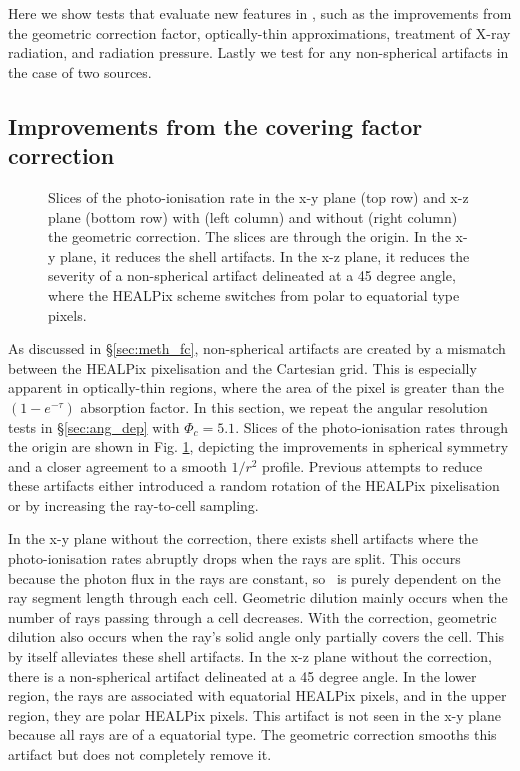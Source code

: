 \documentclass[useAMS,usenatbib]{mn2e}
\begin{document}
Here we show tests that evaluate new features in \moray, such as the
improvements from the geometric correction factor, optically-thin
approximations, treatment of X-ray radiation, and radiation pressure.
Lastly we test for any non-spherical artifacts in the case of two
sources.

\subsection{Improvements from the covering factor correction}
\label{sec:test_fc}

\begin{figure}
  \caption{\label{fig:fc_slices} Slices of the photo-ionisation rate
    in the x-y plane (top row) and x-z plane (bottom row) with (left
    column) and without (right column) the geometric correction.  The
    slices are through the origin.  In the x-y plane, it reduces the
    shell artifacts.  In the x-z plane, it reduces the severity of a
    non-spherical artifact delineated at a 45 degree angle, where the
    HEALPix scheme switches from polar to equatorial type pixels.}
\end{figure}

As discussed in \S\ref{sec:meth_fc}, non-spherical artifacts are
created by a mismatch between the HEALPix pixelisation and the
Cartesian grid.  This is especially apparent in optically-thin
regions, where the area of the pixel is greater than the
$(1-e^{-\tau})$ absorption factor.  In this section, we repeat the
angular resolution tests in \S\ref{sec:ang_dep} with $\Phi_c = 5.1$.
Slices of the photo-ionisation rates through the origin are shown in
Fig. \ref{fig:fc_slices}, depicting the improvements in spherical
symmetry and a closer agreement to a smooth $1/r^2$ profile.  Previous
attempts to reduce these artifacts either introduced a random rotation
of the HEALPix pixelisation \citep[e.g.][]{Abel02_RT, Trac07,
  Krumholz07_ART} or by increasing the ray-to-cell sampling.

In the x-y plane without the correction, there exists shell artifacts
where the photo-ionisation rates abruptly drops when the rays are
split.  This occurs because the photon flux in the rays are constant,
so \kph~is purely dependent on the ray segment length through each
cell.  Geometric dilution mainly occurs when the number of rays
passing through a cell decreases.  With the correction, geometric
dilution also occurs when the ray's solid angle only partially covers
the cell.  This by itself alleviates these shell artifacts.  In the
x-z plane without the correction, there is a non-spherical artifact
delineated at a 45 degree angle.  In the lower region, the rays are
associated with equatorial HEALPix pixels, and in the upper region,
they are polar HEALPix pixels.  This artifact is not seen in the x-y
plane because all rays are of a equatorial type.  The geometric
correction smooths this artifact but does not completely remove it.
\end{document}

